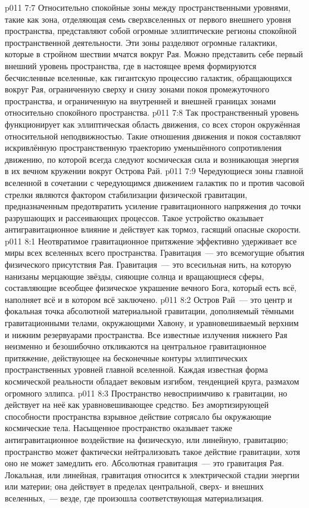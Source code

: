 \vs p011 7:7 \pc Относительно спокойные зоны между пространственными уровнями, такие как зона, отделяющая семь сверхвселенных от первого внешнего уровня пространства, представляют собой огромные эллиптические регионы спокойной пространственной деятельности. Эти зоны разделяют огромные галактики, которые в стройном шествии мчатся вокруг Рая. Можно представить себе первый внешний уровень пространства, где в настоящее время формируются бесчисленные вселенные, как гигантскую процессию галактик, обращающихся вокруг Рая, ограниченную сверху и снизу зонами покоя промежуточного пространства, и ограниченную на внутренней и внешней границах зонами относительно спокойного пространства.
\vs p011 7:8 Так пространственный уровень функционирует как эллиптическая область движения, со всех сторон окружённая относительной неподвижностью. Такие отношения движения и покоя составляют искривлённую пространственную траекторию уменьшённого сопротивления движению, по которой всегда следуют космическая сила и возникающая энергия в их вечном кружении вокруг Острова Рай.
\vs p011 7:9 Чередующиеся зоны главной вселенной в сочетании с чередующимся движением галактик по и против часовой стрелки являются фактором стабилизации физической гравитации, предназначенным предотвратить усиление гравитационного напряжения до точки разрушающих и рассеивающих процессов. Такое устройство оказывает антигравитационное влияние и действует как тормоз, гасящий опасные скорости.
\vs p011 8:1 Неотвратимое гравитационное притяжение эффективно удерживает все миры всех вселенных всего пространства. Гравитация~--- это всемогущие объятия физического присутствия Рая. Гравитация~--- это всесильная нить, на которую нанизаны мерцающие звёзды, сияющие солнца и вращающиеся сферы, составляющие всеобщее физическое украшение вечного Бога, который есть всё, наполняет всё и в котором всё заключено.
\vs p011 8:2 Остров Рай~--- это центр и фокальная точка абсолютной материальной гравитации, дополняемый тёмными гравитационными телами, окружающими Хавону, и уравновешиваемый верхним и нижним резервуарами пространства. Все известные излучения нижнего Рая неизменно и безошибочно откликаются на центральное гравитационное притяжение, действующее на бесконечные контуры эллиптических пространственных уровней главной вселенной. Каждая известная форма космической реальности обладает вековым изгибом, тенденцией круга, размахом огромного эллипса.
\vs p011 8:3 Пространство невосприимчиво к гравитации, но действует на неё как уравновешивающее средство. Без амортизирующей способности пространства взрывное действие сотрясало бы окружающие космические тела. Насыщенное пространство оказывает также антигравитационное воздействие на физическую, или линейную, гравитацию; пространство может фактически нейтрализовать такое действие гравитации, хотя оно не может замедлить его. Абсолютная гравитация~--- это гравитация Рая. Локальная, или линейная, гравитация относится к электрической стадии энергии или материи; она действует в пределах центральной, сверх- и внешних вселенных,~--- везде, где произошла соответствующая материализация.
